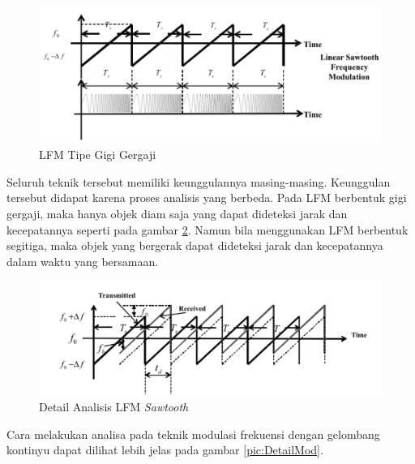 \begin{figure}
	\begin{center}
		\includegraphics[scale=0.65]{pics/bab2/lfmSawtooth.png}
		\caption[LFM Tipe Gigi Gergaji]{LFM Tipe Gigi Gergaji \cite{Jankiraman2018}}
		\label{pic:lfmSaw}
	\end{center}
\end{figure}

Seluruh teknik tersebut memiliki keunggulannya masing-masing. Keunggulan tersebut didapat karena proses analisis yang berbeda. Pada LFM berbentuk gigi gergaji, maka hanya objek diam saja yang dapat dideteksi jarak dan kecepatannya seperti pada gambar \ref{pic:lfmDetail}. Namun bila menggunakan LFM berbentuk segitiga, maka objek yang bergerak dapat dideteksi jarak dan kecepatannya dalam waktu yang bersamaan.

\begin{figure}
	\begin{center}
		\includegraphics[scale=0.65]{pics/bab2/lfmDetail.png}
		\caption[Detail Analisis LFM \textit{Sawtooth}]{Detail Analisis LFM \textit{Sawtooth} \cite{Jankiraman2018}}
		\label{pic:lfmDetail}
	\end{center}
\end{figure}

Cara melakukan analisa pada teknik modulasi frekuensi dengan gelombang kontinyu dapat dilihat lebih jelas pada gambar \ref{pic:DetailMod}.

